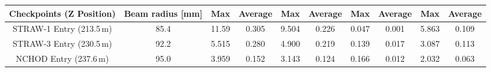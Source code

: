 \documentclass[../../main.tex]{subfiles}
\begin{document}
\begin{table}[htbp]
{\begin{tabular}{|cl|clclclcl|}
        \multicolumn{1}{|c|}{\textbf{Checkpoints (Z Position)}} & 
        \multicolumn{1}{c|}{\textbf{Beam radius [mm]}} & 
        \multicolumn{1}{c|}{\textbf{Max}} & 
        \multicolumn{1}{c|}{\textbf{Average}} & 
        \multicolumn{1}{c|}{\textbf{Max}} & 
        \multicolumn{1}{c|}{\textbf{Average}} & 
        \multicolumn{1}{c|}{\textbf{Max}} & 
        \multicolumn{1}{c|}{\textbf{Average}} & 
        \multicolumn{1}{c|}{\textbf{Max}} & 
        \textbf{Average} \\ \hline
        STRAW-1 Entry (213.5\,m) & \multicolumn{1}{|c|}{85.4} & \multicolumn{1}{c|}{11.59} & \multicolumn{1}{c|}{0.305} & \multicolumn{1}{c|}{9.504} & \multicolumn{1}{c|}{0.226} & \multicolumn{1}{c|}{0.047} & \multicolumn{1}{c|}{0.001} & \multicolumn{1}{c|}{5.863} & \multicolumn{1}{c|}{0.109} \\ \hline
        STRAW-3 Entry (230.5\,m) & \multicolumn{1}{|c|}{92.2} & \multicolumn{1}{c|}{5.515} & \multicolumn{1}{c|}{0.280} & \multicolumn{1}{c|}{4.900} & \multicolumn{1}{c|}{0.219} & \multicolumn{1}{c|}{0.139} & \multicolumn{1}{c|}{0.017} & \multicolumn{1}{c|}{3.087} & \multicolumn{1}{c|}{0.113} \\ \hline
        NCHOD Entry (237.6\,m) & \multicolumn{1}{|c|}{95.0}& \multicolumn{1}{c|}{3.959} & \multicolumn{1}{c|}{0.152} & \multicolumn{1}{c|}{3.143} & \multicolumn{1}{c|}{0.124} & \multicolumn{1}{c|}{0.166} & \multicolumn{1}{c|}{0.012} & \multicolumn{1}{c|}{2.032} & \multicolumn{1}{c|}{0.063} \\ \hline

\end{tabular}}
\end{table}
\end{document}
